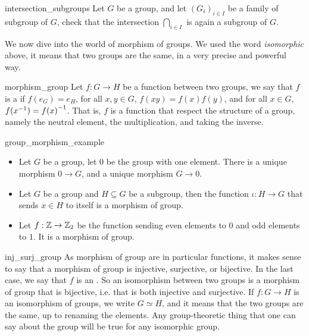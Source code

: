 \begin{cex}{}{intersection_subgroups}
    Let \( G \) be a group, and let \( (G_i)_{i \in I} \) be a family of subgroup of \( G \), check that the intersection \( \bigcap_{i\in I} \) is again a subgroup of \( G \).
\end{cex}

We now dive into the world of morphism of groups. We used the word \textit{isomorphic} above, it means that two groups are the same, in a very precise and powerful way.

\begin{cdef}{}{morphism_group}
    Let \( f : G \to H \) be a function between two groups, we say that \( f \) is a  if \( f(e_G) = e_H \), for all \( x, y \in G \), \( f(xy) = f(x)f(y) \), and for all \( x \in G \), \( f({x}^{-1}) = {f(x)}^{-1} \). That is, \( f \) is a function that respect the structure of a group, namely the neutral element, the multiplication, and taking the inverse. 
\end{cdef}

\begin{cexp}{}{group_morphism_example}
    \begin{itemize}
        \item Let \( G \) be a group, let \( 0 \) be the group with one element. There is a unique morphism \( 0 \to G \), and a unique morphism \( G \to 0 \).
        \item Let \( G \) be a group and \( H \subseteq G \) be a subgroup, then the function \( \iota : H \to G \) that sends \( x \in H \) to itself is a morphism of group.
        \item Let \( f : \mathbb{Z} \to \mathbb{Z}_2 \) be the function sending even elements to \( 0 \) and odd elements to \( 1 \). It is a morphism of group. 
    \end{itemize}
\end{cexp}

\begin{crem}{}{inj_surj_group}
    As morphism of group are in particular functions, it makes sense to say that a morphism of group is injective, surjective, or bijective. In the last case, we say that \( f \) is an . So an isomorphism between two groups is a morphism of group that is bijective, i.e. that is both injective and surjective. If \( f : G \to H \) is an isomorphism of groups, we write \( G \simeq H \), and it means that the two groups are the same, up to renaming the elements. Any group-theoretic thing that one can say about the group will be true for any isomorphic group.
\end{crem}

